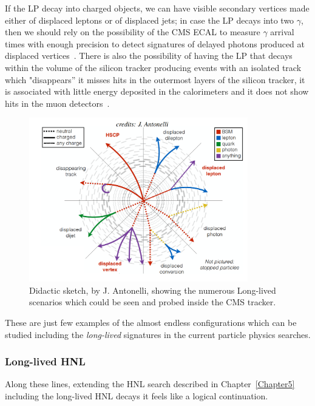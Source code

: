 If the
LP decay into charged objects, we can have visible secondary vertices
made either of displaced leptons or of displaced jets; in case the LP decays into two $\gamma$,
then we should rely on the possibility of the CMS
ECAL to measure $\gamma$ arrival times with enough precision to detect
signatures of delayed photons produced at displaced
vertices~\cite{Sirunyan:2019wau}.
There is also the possibility of having the LP that decays within the
volume of the silicon tracker producing events with an isolated track
which "disappears'' \ie it misses hits in the outermost layers of the
silicon tracker, it is associated with little energy deposited in the
calorimeters and it does not show hits in the muon detectors~\cite{Sirunyan_2020disapp}. 
\begin{figure}[h]
\centering
\includegraphics[width=0.85\textwidth]{Figures/c6/antonelli_skech.pdf}
\caption{Didactic sketch, by J. Antonelli, showing the numerous
  Long-lived scenarios which could be seen and probed inside the CMS tracker. }
\label{fig:c6antonelli}
\end{figure}

These are just few examples of the almost endless configurations which can
be studied including the \emph{long-lived} signatures in the
current particle physics searches. 

\subsubsection{Long-lived HNL}
Along these lines, extending the HNL search described in
Chapter~\ref{Chapter5} including the long-lived HNL decays it feels like a logical
continuation. 

